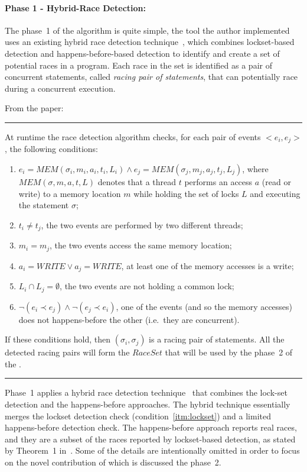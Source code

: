 \begin{refsection}
\paragraph{Phase 1 - Hybrid-Race Detection:}
The phase~1 of the algorithm is quite simple, the tool the author implemented
uses an existing hybrid race detection
technique~\cite{O'Callahan:2003:HDD:781498.781528}, which combines
lockset-based detection and happens-before-based detection to identify and
create a set of potential races in a program.
%
Each race in the set is identified as a pair of concurrent statements, called
\emph{racing pair of statements}, that can potentially race during a
concurrent execution.

From the paper:

\noindent\rule[0.5ex]{\linewidth}{1pt}

At runtime the race detection algorithm checks, for each pair of events
$<e_i,e_j>$, the following conditions:

\begin{enumerate}
\item
  $e_i = MEM(\sigma_i, m_i, a_i, t_i, L_i) \wedge e_j = MEM(\sigma_j, m_j,
  a_j, t_j, L_j)$,
  where $MEM(\sigma, m, a, t, L)$ denotes that a thread $t$ performs an access
  $a$ (read or write) to a memory location $m$ while holding the set of locks
  $L$ and executing the statement $\sigma$;
\item $t_i \neq t_j$, the two events are performed by two different
  threads;
\item $m_i = m_j$, the two events access the same memory location;
\item $a_i = WRITE \vee a_j = WRITE$, at least one of the memory accesses is a
  write;
\item \label{itm:lockset} $L_i \cap L_j = \emptyset$, the two events are not holding a common lock;
\item $\neg(e_i \prec e_j) \wedge \neg(e_j \prec e_i)$, one of the events (and
  so the memory accesses) does not happens-before the other (i.e.\ they are
  concurrent).
\end{enumerate}

If these conditions hold, then $(\sigma_i, \sigma_j)$ is a racing pair of
statements.
%
All the detected racing pairs will form the $RaceSet$ that will be used by the
phase~2 of the \rfuz.

\noindent\rule[0.5ex]{\linewidth}{1pt}

Phase~1 applies a hybrid race detection
technique~\cite{O'Callahan:2003:HDD:781498.781528} that combines the lock-set
detection and the happens-before approaches.
%
The hybrid technique essentially merges the lockset detection check
(condition~\ref{itm:lockset}) and a limited happens-before detection check.
%
The happens-before approach reports real races, and they are a subset of the
races reported by lockset-based detection, as stated by Theorem~1
in~\cite{O'Callahan:2003:HDD:781498.781528}.
%
Some of the details are intentionally omitted in order to focus on the novel
contribution of \rfuz which is discussed the phase~2.


\end{refsection}

